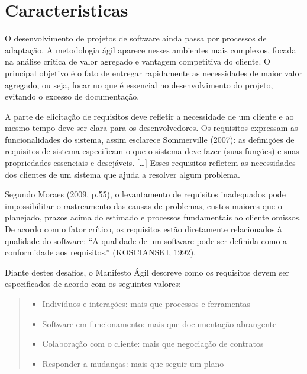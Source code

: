 \section[Caracteristicas]{Caracteristicas}
O desenvolvimento de projetos de software ainda passa por processos de adaptação. A metodologia ágil aparece nesses ambientes mais complexos, focada na análise crítica de valor agregado e vantagem competitiva do cliente. O principal objetivo é o fato de entregar rapidamente as necessidades de maior valor agregado, ou seja, focar no que é essencial no desenvolvimento do projeto, evitando o excesso de documentação.

A parte de elicitação de requisitos deve refletir a necessidade de um cliente e ao mesmo tempo deve ser clara para os desenvolvedores. Os requisitos expressam as funcionalidades do sistema, assim esclarece Sommerville (2007): as definições de requisitos de sistema especificam o que o sistema deve fazer (suas funções) e suas propriedades essenciais e desejáveis. […] Esses requisitos refletem as necessidades dos clientes de um sistema que ajuda a resolver algum problema.

Segundo Moraes (2009, p.55), o levantamento de requisitos inadequados pode impossibilitar o rastreamento das causas de problemas, custos maiores que o planejado, prazos acima do estimado e processos fundamentais ao cliente omissos.
De acordo com o fator crítico, os requisitos estão diretamente relacionados à qualidade do software: “A qualidade de um software pode ser definida como a conformidade aos requisitos.” (KOSCIANSKI, 1992).

Diante destes desafios, o Manifesto Ágil descreve como os requisitos devem ser especificados de acordo com os seguintes valores:
\begin{quote} 
    \begin{itemize}
        \item Indivíduos e interações: mais que processos e ferramentas
        \item Software em funcionamento: mais que documentação abrangente
        \item Colaboração com o cliente: mais que negociação de contratos
        \item Responder a mudanças: mais que seguir um plano
    \end{itemize}
\end{quote}

